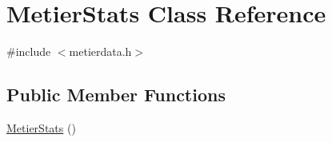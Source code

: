 \hypertarget{class_metier_stats}{}\section{Metier\+Stats Class Reference}
\label{class_metier_stats}


{\ttfamily \#include $<$metierdata.\+h$>$}

\subsection*{Public Member Functions}
\begin{DoxyCompactItemize}
\item 
\mbox{\hyperlink{class_metier_stats_a31f0a96c6a8619d7cdd48a3bf0b5283d}{Metier\+Stats}} ()
\end{DoxyCompactItemize}
